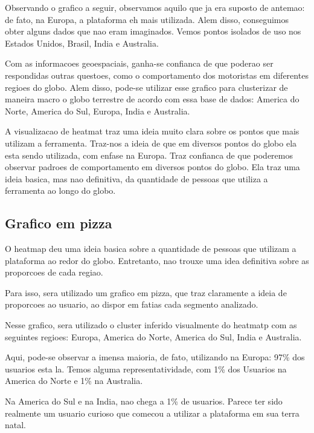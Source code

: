 \documentclass[10pt, conference]{IEEEtran}
\begin{document}
Observando o grafico a seguir, observamos aquilo que ja era suposto de antemao: de fato,
na Europa, a plataforma eh mais utilizada. Alem disso, conseguimos obter alguns dados que nao
eram imaginados. Vemos pontos isolados de uso nos Estados Unidos, Brasil, India e Australia.

Com as informacoes geoespaciais, ganha-se confianca de que poderao ser respondidas outras questoes,
como o comportamento dos motoristas em diferentes regioes do globo. Alem disso, pode-se utilizar
esse grafico para clusterizar de maneira macro o globo terrestre de acordo com essa base de 
dados: America do Norte, America do Sul, Europa, India e Australia.

A visualizacao de heatmat traz uma ideia muito clara sobre os pontos que mais utilizam a 
ferramenta. Traz-nos a ideia de que em diversos pontos do globo ela esta sendo utilizada, com
enfase na Europa. Traz confianca de que poderemos observar padroes de comportamento em diversos
pontos do globo. Ela traz uma ideia basica, mas nao definitiva, da quantidade de pessoas
que utiliza a ferramenta ao longo do globo.




\subsection{Grafico em pizza}

O heatmap deu uma ideia basica sobre a quantidade de pessoas que utilizam a plataforma ao redor
do globo. Entretanto, nao trouxe uma idea definitiva sobre as proporcoes de cada regiao.

Para isso, sera utilizado um grafico em pizza, que traz claramente a ideia de proporcoes ao
usuario, ao dispor em fatias cada segmento analizado.

Nesse grafico, sera utilizado o cluster inferido visualmente do heatmatp com as seguintes
regioes: Europa, America do Norte, America do Sul, India e Australia.

Aqui, pode-se observar a imensa maioria, de fato, utilizando na Europa: 97\% dos usuarios
esta la. Temos alguma representatividade, com 1\% dos Usuarios na America do Norte e 1\% 
na Australia.

Na America do Sul e na India, nao chega a 1\% de usuarios. Parece ter sido realmente um usuario
curioso que comecou a utilizar a plataforma em sua terra natal.
\end{document}
